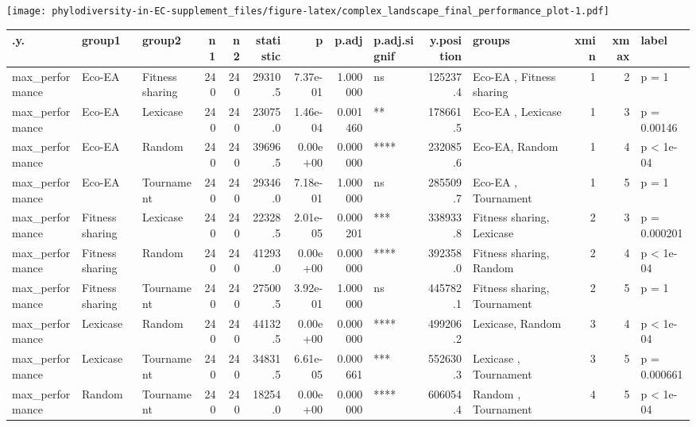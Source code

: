 \documentclass[]{book}
\newenvironment{Shaded}{\begin{snugshade}}{\end{snugshade}}
\newcommand{\DataTypeTok}[1]{\textcolor[rgb]{0.13,0.29,0.53}{#1}}
\newcommand{\KeywordTok}[1]{\textcolor[rgb]{0.13,0.29,0.53}{\textbf{#1}}}
\newcommand{\NormalTok}[1]{#1}
\newcommand{\OperatorTok}[1]{\textcolor[rgb]{0.81,0.36,0.00}{\textbf{#1}}}
\newcommand{\StringTok}[1]{\textcolor[rgb]{0.31,0.60,0.02}{#1}}
\begin{document}
\texttt{[image: phylodiversity-in-EC-supplement\_files/figure-latex/complex\_landscape\_final\_performance\_plot-1.pdf]}

\begin{Shaded}
\end{Shaded}

\begin{table}
\centering
\begin{tabular}[t]{l|l|l|r|r|r|r|r|l|r|l|r|r|l}
\hline
.y. & group1 & group2 & n1 & n2 & statistic & p & p.adj & p.adj.signif & y.position & groups & xmin & xmax & label\\
\hline
max\_performance & Eco-EA & Fitness sharing & 240 & 240 & 29310.5 & 7.37e-01 & 1.000000 & ns & 125237.4 & Eco-EA         , Fitness sharing & 1 & 2 & p = 1\\
\hline
max\_performance & Eco-EA & Lexicase & 240 & 240 & 23075.0 & 1.46e-04 & 0.001460 & ** & 178661.5 & Eco-EA  , Lexicase & 1 & 3 & p = 0.00146\\
\hline
max\_performance & Eco-EA & Random & 240 & 240 & 39696.5 & 0.00e+00 & 0.000000 & **** & 232085.6 & Eco-EA, Random & 1 & 4 & p < 1e-04\\
\hline
max\_performance & Eco-EA & Tournament & 240 & 240 & 29346.0 & 7.18e-01 & 1.000000 & ns & 285509.7 & Eco-EA    , Tournament & 1 & 5 & p = 1\\
\hline
max\_performance & Fitness sharing & Lexicase & 240 & 240 & 22328.5 & 2.01e-05 & 0.000201 & *** & 338933.8 & Fitness sharing, Lexicase & 2 & 3 & p = 0.000201\\
\hline
max\_performance & Fitness sharing & Random & 240 & 240 & 41293.0 & 0.00e+00 & 0.000000 & **** & 392358.0 & Fitness sharing, Random & 2 & 4 & p < 1e-04\\
\hline
max\_performance & Fitness sharing & Tournament & 240 & 240 & 27500.5 & 3.92e-01 & 1.000000 & ns & 445782.1 & Fitness sharing, Tournament & 2 & 5 & p = 1\\
\hline
max\_performance & Lexicase & Random & 240 & 240 & 44132.5 & 0.00e+00 & 0.000000 & **** & 499206.2 & Lexicase, Random & 3 & 4 & p < 1e-04\\
\hline
max\_performance & Lexicase & Tournament & 240 & 240 & 34831.5 & 6.61e-05 & 0.000661 & *** & 552630.3 & Lexicase  , Tournament & 3 & 5 & p = 0.000661\\
\hline
max\_performance & Random & Tournament & 240 & 240 & 18254.0 & 0.00e+00 & 0.000000 & **** & 606054.4 & Random    , Tournament & 4 & 5 & p < 1e-04\\
\hline
\end{tabular}
\end{table}
\end{document}
